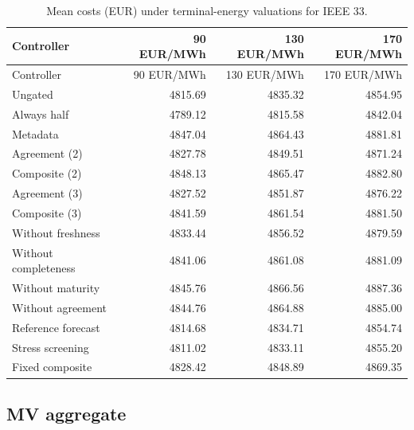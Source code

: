 \documentclass[11pt]{article}
\begin{document}
\small\begin{longtable}{lrrr}
\caption{Mean costs (EUR) under terminal-energy valuations for IEEE 33.}\\\toprule
Controller & 90 EUR/MWh & 130 EUR/MWh & 170 EUR/MWh\\\midrule
\endfirsthead
\toprule
Controller & 90 EUR/MWh & 130 EUR/MWh & 170 EUR/MWh\\\midrule
\endhead
\bottomrule\endfoot
Ungated & 4815.69 & 4835.32 & 4854.95\\
Always half & 4789.12 & 4815.58 & 4842.04\\
Metadata & 4847.04 & 4864.43 & 4881.81\\
Agreement (2) & 4827.78 & 4849.51 & 4871.24\\
Composite (2) & 4848.13 & 4865.47 & 4882.80\\
Agreement (3) & 4827.52 & 4851.87 & 4876.22\\
Composite (3) & 4841.59 & 4861.54 & 4881.50\\
Without freshness & 4833.44 & 4856.52 & 4879.59\\
Without completeness & 4841.06 & 4861.08 & 4881.09\\
Without maturity & 4845.76 & 4866.56 & 4887.36\\
Without agreement & 4844.76 & 4864.88 & 4885.00\\
Reference forecast & 4814.68 & 4834.71 & 4854.74\\
Stress screening & 4811.02 & 4833.11 & 4855.20\\
Fixed composite & 4828.42 & 4848.89 & 4869.35\\
\end{longtable}\normalsize
{}\subsection{MV aggregate}
\end{document}
